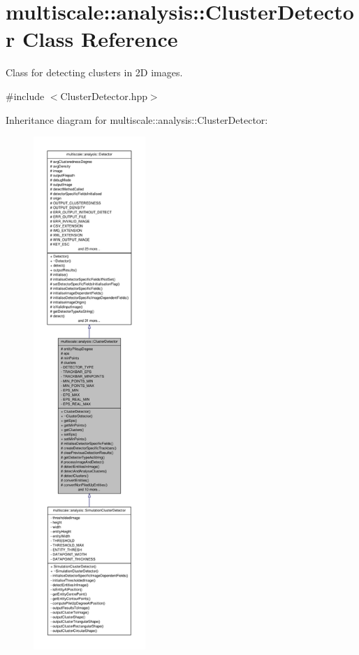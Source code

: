 \hypertarget{classmultiscale_1_1analysis_1_1ClusterDetector}{\section{multiscale\-:\-:analysis\-:\-:\-Cluster\-Detector \-Class \-Reference}
\label{classmultiscale_1_1analysis_1_1ClusterDetector}
}


\-Class for detecting clusters in 2\-D images.  




{\ttfamily \#include $<$\-Cluster\-Detector.\-hpp$>$}



\-Inheritance diagram for multiscale\-:\-:analysis\-:\-:\-Cluster\-Detector\-:\nopagebreak
\begin{figure}[H]
\begin{center}
\leavevmode
\includegraphics[height=550pt]{classmultiscale_1_1analysis_1_1ClusterDetector__inherit__graph}
\end{center}
\end{figure}
